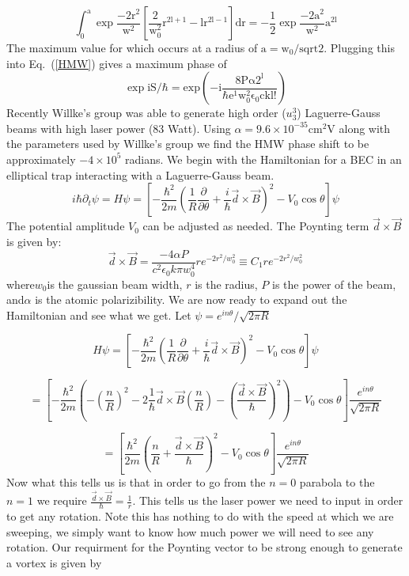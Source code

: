 \begin{equation}
\mathrm{\int_0^a\!\exp{\frac{-2r^2}{w^2}}\left[ \frac{2}{w_0^2}r^{2l+1}-lr^{2l-1}\right]\!dr = -\frac{1}{2}\exp{\frac{-2a^2}{w^2}}a^{2l}}
\end{equation}
The maximum value for which occurs at a radius of $\mathrm{a=w_0/sqrt{2}}$.  Plugging this into Eq.\ (\ref{HMW}) gives a maximum phase of
\begin{equation}
\mathrm{\exp{iS/\hbar}=exp{\left(-i\frac{8P \alpha 2^l}{\hbar e^1 w_0^{2} \epsilon_0 ck l!}\right)}}
\end{equation}
Recently Willke's \cite{Willke} group was able to generate high order ($u^3_3$) Laguerre-Gauss beams with high laser power (83 Watt). Using $\alpha=9.6\times10^{-35}{\mathrm{cm}}^2\mathrm{V}$ along with the parameters used by Willke's group we find the HMW phase shift to be approximately $-4\times10^5$ radians. 
We begin with the Hamiltonian for a BEC in an elliptical trap interacting
with a Laguerre-Gauss beam.
\[
i\hbar\partial_{t}\psi=H\psi=\left[-\frac{\hbar^{2}}{2m}\left(\frac{1}{R}\frac{\partial}{\partial\theta}+\frac{i}{\hbar}\vec{d}\times\vec{B}\right)^{2}-V_{0}\cos\theta\right]\psi
\]
The potential amplitude $V_{0}$ can be adjusted as needed. The Poynting
term $\vec{d}\times\vec{B}$ is given by:
\[
\vec{d}\times\vec{B}=\frac{-4\alpha P}{c^{2}\epsilon_{0}k\pi w_{0}^{4}}re^{-2r^{2}/w_{0}^{2}}\equiv C_{1}re^{-2r^{2}/w_{0}^{2}}
\]
where$w_{0}$is the gaussian beam width, $r$ is the radius, $P$
is the power of the beam, and$\alpha$ is the atomic polarizibility.
We are now ready to expand out the Hamiltonian and see what we get.
Let $\psi=e^{in\theta}/\sqrt{2\pi R}$

\[
H\psi=\left[-\frac{\hbar^{2}}{2m}\left(\frac{1}{R}\frac{\partial}{\partial\theta}+\frac{i}{\hbar}\vec{d}\times\vec{B}\right)^{2}-V_{0}\cos\theta\right]\psi
\]


\[
=\left[-\frac{\hbar^{2}}{2m}\left(-\left(\frac{n}{R}\right)^{2}-2\frac{1}{\hbar}\vec{d}\times\vec{B}\left(\frac{n}{R}\right)-\left(\frac{\vec{d}\times\vec{B}}{\hbar}\right)^{2}\right)-V_{0}\cos\theta\right]\frac{e^{in\theta}}{\sqrt{2\pi R}}
\]


\[
=\left[\frac{\hbar^{2}}{2m}\left(\frac{n}{R}+\frac{\vec{d}\times\vec{B}}{\hbar}\right)^{2}-V_{0}\cos\theta\right]\frac{e^{in\theta}}{\sqrt{2\pi R}}
\]
Now what this tells us is that in order to go from the $n=0$ parabola
to the $n=1$ we require $\frac{\vec{d}\times\vec{B}}{\hbar}=\frac{1}{r}$.
This tells us the laser power we need to input in order to get any
rotation. Note this has nothing to do with the speed at which we are
sweeping, we simply want to know how much power we will need to see
any rotation. Our requirment for the Poynting vector to be strong
enough to generate a vortex is given by

